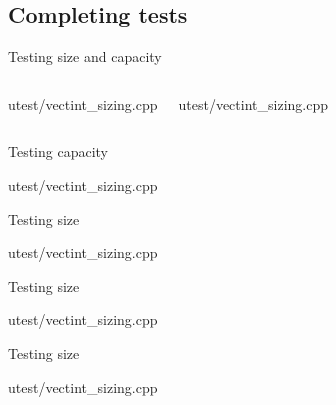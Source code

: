 \subsection{Completing tests}

\begin{frame}[t]{Testing size and capacity}
\begin{columns}[T]

\begin{block}{utest/vectint\_sizing.cpp}

\end{block}

\begin{block}{utest/vectint\_sizing.cpp}

\end{block}

\end{columns}
\end{frame}

\begin{frame}[t]{Testing capacity}
\begin{block}{utest/vectint\_sizing.cpp}

\end{block}
\end{frame}

\begin{frame}[t]{Testing size}
\begin{block}{utest/vectint\_sizing.cpp}

\end{block}
\end{frame}

\begin{frame}[t]{Testing size}
\begin{block}{utest/vectint\_sizing.cpp}

\end{block}
\end{frame}

\begin{frame}[t]{Testing size}
\begin{block}{utest/vectint\_sizing.cpp}

\end{block}
\end{frame}

